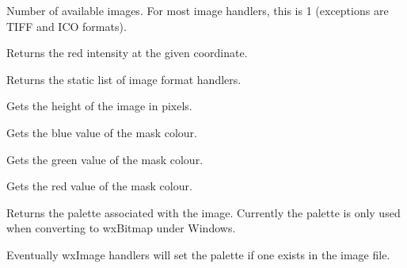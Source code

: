 
Number of available images. For most image handlers, this is 1 (exceptions
are TIFF and ICO formats).

\label{wximagegetred}


Returns the red intensity at the given coordinate.



Returns the static list of image format handlers.



\label{wximagegetheight}


Gets the height of the image in pixels.

\label{wximagegetmaskblue}


Gets the blue value of the mask colour.

\label{wximagegetmaskgreen}


Gets the green value of the mask colour.

\label{wximagegetmaskred}


Gets the red value of the mask colour.

\label{wximagegetpalette}


Returns the palette associated with the image. Currently the palette is only
used when converting to wxBitmap under Windows.

Eventually wxImage handlers will set the palette if one exists in the image file.

\label{wximagegetsubimage}


